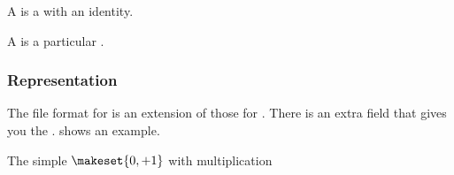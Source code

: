
A \Monoid is a \Semigroup with an identity.


A \FiniteMonoid is a particular \FiniteSemigroup.


\subsubsection*{Representation}

The file format for  is an extension of those for .
There is an extra field  that gives you the .
 shows an example.

\begin{marginfigure}%
    \caption{The simple  $\makeset{0,+1}$ with multiplication}%
    \label{fig:monoid2}%
\end{marginfigure}%



